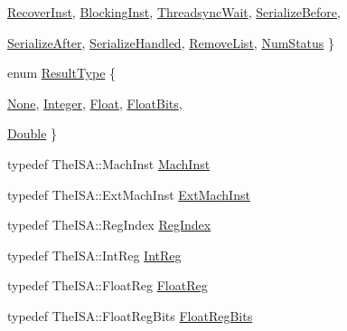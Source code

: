 \begin{DoxyCompactItemize}
\par
\hyperlink{classInOrderDynInst_a67a0db04d321a74b7e7fcfd3f1a3f70ba9c362affef98d47542b10870213f38b0}{RecoverInst}, 
\hyperlink{classInOrderDynInst_a67a0db04d321a74b7e7fcfd3f1a3f70babe0a1c80170ca464e1ffe07cf27c8790}{BlockingInst}, 
\hyperlink{classInOrderDynInst_a67a0db04d321a74b7e7fcfd3f1a3f70baa4ae9ccc1d686d1f743d77664c209c7c}{ThreadsyncWait}, 
\hyperlink{classInOrderDynInst_a67a0db04d321a74b7e7fcfd3f1a3f70ba6fccc334c05c6f43f90dc60238f6c39e}{SerializeBefore}, 
\par
\hyperlink{classInOrderDynInst_a67a0db04d321a74b7e7fcfd3f1a3f70bab11834485756e0e9b84886d7d014a08f}{SerializeAfter}, 
\hyperlink{classInOrderDynInst_a67a0db04d321a74b7e7fcfd3f1a3f70ba5dcfe61e192f9f6a72bc7ff9c5cd8a2b}{SerializeHandled}, 
\hyperlink{classInOrderDynInst_a67a0db04d321a74b7e7fcfd3f1a3f70badff34f430d26bb38b0259d1f5d770f0d}{RemoveList}, 
\hyperlink{classInOrderDynInst_a67a0db04d321a74b7e7fcfd3f1a3f70bab37ed3bea9670ef9797b74ea37aed2f3}{NumStatus}
 \}
\item 
enum \hyperlink{classInOrderDynInst_aa71b5fc2a82d29a91db3a734ff892a49}{ResultType} \{ \par
\hyperlink{classInOrderDynInst_aa71b5fc2a82d29a91db3a734ff892a49ac9d3e887722f2bc482bcca9d41c512af}{None}, 
\hyperlink{classInOrderDynInst_aa71b5fc2a82d29a91db3a734ff892a49a1e2f89e867cd91c3de2ea9fbd2ef96a3}{Integer}, 
\hyperlink{classInOrderDynInst_aa71b5fc2a82d29a91db3a734ff892a49ad67b0ee7230dcecb610254e4e5e589cd}{Float}, 
\hyperlink{classInOrderDynInst_aa71b5fc2a82d29a91db3a734ff892a49a85a77c8e492bcc8f63077cc8d7610768}{FloatBits}, 
\par
\hyperlink{classInOrderDynInst_aa71b5fc2a82d29a91db3a734ff892a49afb7825ebed9ad96348ee8588d84db633}{Double}
 \}
\item 
typedef TheISA::MachInst \hyperlink{classInOrderDynInst_a4617f528417b8f55f809ae0988284c9b}{MachInst}
\item 
typedef TheISA::ExtMachInst \hyperlink{classInOrderDynInst_a5605d4fc727eae9e595325c90c0ec108}{ExtMachInst}
\item 
typedef TheISA::RegIndex \hyperlink{classInOrderDynInst_a36d25e03e43fa3bb4c5482cbefe5e0fb}{RegIndex}
\item 
typedef TheISA::IntReg \hyperlink{classInOrderDynInst_a1355cb78d031430d4d70eb5080267604}{IntReg}
\item 
typedef TheISA::FloatReg \hyperlink{classInOrderDynInst_a75484259f1855aabc8d74c6eb1cfe186}{FloatReg}
\item 
typedef TheISA::FloatRegBits \hyperlink{classInOrderDynInst_aab5eeae86499f9bfe15ef79360eccc64}{FloatRegBits}

\end{DoxyCompactItemize}
